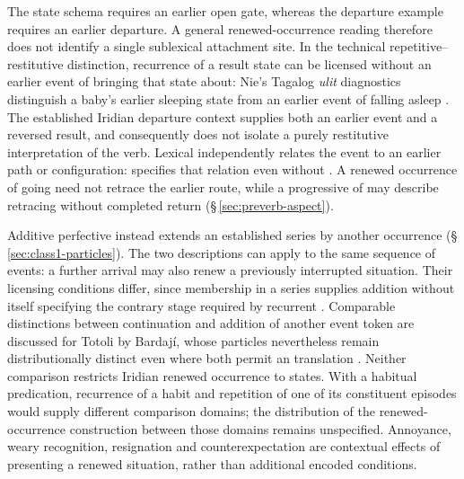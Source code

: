 The state schema requires an earlier open gate, whereas the departure example
requires an earlier departure. A general renewed-occurrence reading therefore
does not identify a single sublexical attachment site. In the technical
repetitive--restitutive distinction, recurrence of a result state can be
licensed without an earlier event of bringing that state about: Nie's
Tagalog \textit{ulit} diagnostics distinguish a baby's earlier sleeping state
from an earlier event of falling asleep
\cite[§4.1, pp.~118--120, examples~47--50]{nie2020causatives}.
The established Iridian departure context supplies both an earlier event and
a reversed result, and consequently does not isolate a purely restitutive
interpretation of the verb. Lexical  independently relates the event
to an earlier path or configuration:   specifies that relation even without . A renewed occurrence
of going need not retrace the earlier route, while a progressive of
 may describe retracing without completed return
(§\,\ref{sec:preverb-aspect}).

Additive perfective  instead extends an established series by another
occurrence (§\,\ref{sec:class1-particles}). The two descriptions can apply to
the same sequence of events: a further arrival may also renew a previously
interrupted situation. Their licensing conditions differ, since membership
in a series supplies addition without itself specifying the contrary stage
required by recurrent . Comparable distinctions between
continuation and addition of another event token are discussed for Totoli by
Bardají, whose particles nevertheless remain distributionally distinct even
where both permit an  translation
\cite[§§3.1, 3.3]{bardaji2025phasal}. Neither comparison restricts Iridian
renewed occurrence to states. With a habitual predication, recurrence of a
habit and repetition of one of its constituent episodes would supply
different comparison domains; the distribution of the renewed-occurrence
construction between those domains remains unspecified. Annoyance, weary
recognition, resignation and counterexpectation are contextual effects of
presenting a renewed situation, rather than additional encoded conditions.

